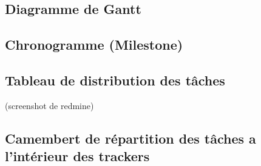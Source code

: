 \subsection{Diagramme de Gantt}
\subsection{Chronogramme (Milestone)}
\subsection{Tableau de distribution des tâches}
(screenshot de redmine)
\subsection{Camembert de répartition des tâches a l'intérieur des trackers}